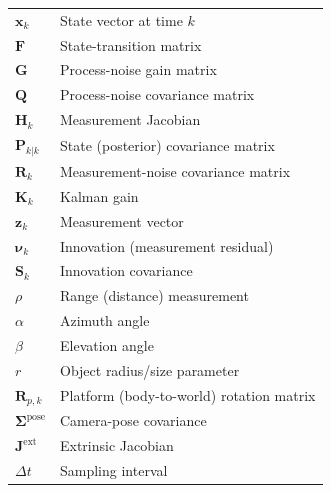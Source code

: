 \begin{longtable}{ll}
$\bm{x}_k$        & State vector at time $k$ \\
$\bm{F}$          & State-transition matrix \\
$\bm{G}$          & Process-noise gain matrix \\
$\bm{Q}$          & Process-noise covariance matrix \\
$\bm{H}_k$        & Measurement Jacobian \\
$\bm{P}_{k|k}$    & State (posterior) covariance matrix \\
$\bm{R}_k$        & Measurement-noise covariance matrix \\
$\bm{K}_k$        & Kalman gain \\
$\bm{z}_k$        & Measurement vector \\
$\bm{\nu}_k$      & Innovation (measurement residual) \\
$\bm{S}_k$        & Innovation covariance \\
$\rho$            & Range (distance) measurement \\
$\alpha$          & Azimuth angle \\
$\beta$           & Elevation angle \\
$r$               & Object radius/size parameter \\
$\bm{R}_{p,k}$    & Platform (body-to-world) rotation matrix \\
$\bm{\Sigma}^{\text{pose}}$ & Camera-pose covariance \\
$\bm{J}^{\text{ext}}$       & Extrinsic Jacobian \\
$\Delta t$        & Sampling interval \\
\end{longtable}
